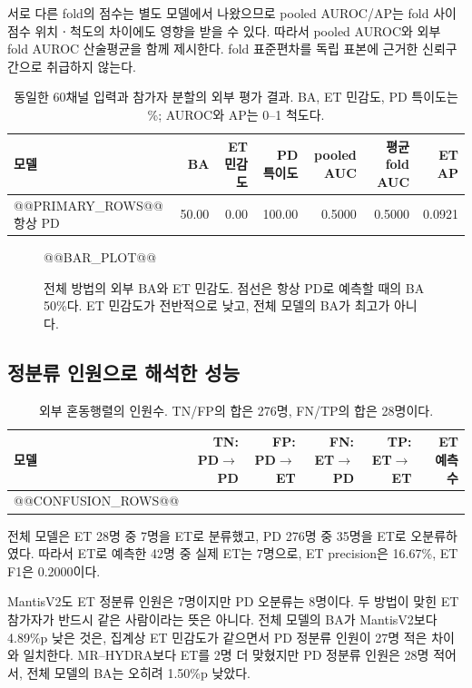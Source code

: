 \documentclass[11pt,a4paper]{article}
\numberwithin{equation}{section}
\begin{document}
서로 다른 fold의 점수는 별도 모델에서 나왔으므로 pooled AUROC/AP는
fold 사이 점수 위치ㆍ척도의 차이에도 영향을 받을 수 있다.
따라서 pooled AUROC와 외부 fold AUROC 산술평균을 함께 제시한다.
fold 표준편차를 독립 표본에 근거한 신뢰구간으로 취급하지 않는다.

\begin{table}[H]\centering\small\setlength{\tabcolsep}{4pt}
\caption{동일한 60채널 입력과 참가자 분할의 외부 평가 결과.
BA, ET 민감도, PD 특이도는 \%; AUROC와 AP는 0--1 척도다.}
\begin{tabular}{@{}lrrrrrr@{}}\toprule
 모델 & BA & ET 민감도 & PD 특이도 & pooled AUC & 평균 fold AUC & ET AP\\\midrule
@@PRIMARY_ROWS@@
\midrule
항상 PD & 50.00 & 0.00 & 100.00 & 0.5000 & 0.5000 & 0.0921\\\bottomrule
\end{tabular}\label{tab:primary}
\end{table}

\begin{figure}[H]\centering
@@BAR_PLOT@@
\caption{전체 방법의 외부 BA와 ET 민감도. 점선은 항상 PD로 예측할 때의
BA 50\%다. ET 민감도가 전반적으로 낮고, 전체 모델의 BA가 최고가 아니다.}
\label{fig:bars}
\end{figure}

\subsection{정분류 인원으로 해석한 성능}
\begin{table}[H]\centering\small
\caption{외부 혼동행렬의 인원수. TN/FP의 합은 276명, FN/TP의 합은 28명이다.}
\begin{tabular}{@{}lrrrrr@{}}\toprule
 모델 & TN: PD$\to$PD & FP: PD$\to$ET & FN: ET$\to$PD & TP: ET$\to$ET & ET 예측 수\\\midrule
@@CONFUSION_ROWS@@
\bottomrule\end{tabular}\label{tab:confusion}
\end{table}
전체 모델은 ET 28명 중 7명을 ET로 분류했고, PD 276명 중 35명을 ET로
오분류하였다. 따라서 ET로 예측한 42명 중 실제 ET는 7명으로,
ET precision은 16.67\%, ET F1은 0.2000이다.

MantisV2도 ET 정분류 인원은 7명이지만 PD 오분류는 8명이다.
두 방법이 맞힌 ET 참가자가 반드시 같은 사람이라는 뜻은 아니다.
전체 모델의 BA가 MantisV2보다 4.89\%p 낮은 것은, 집계상 ET 민감도가 같으면서
PD 정분류 인원이 27명 적은 차이와 일치한다.
MR--HYDRA보다 ET를 2명 더 맞혔지만 PD 정분류 인원은 28명 적어서,
전체 모델의 BA는 오히려 1.50\%p 낮았다.
\end{document}
